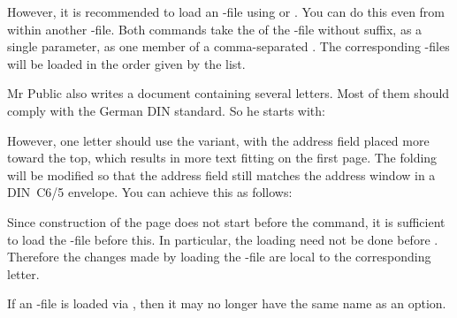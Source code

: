 However, it is recommended to load an -file using
 or
. You can do this
even from within another -file. Both commands take the 
of the -file without suffix,  as a single
parameter,  as one member of a comma-separated
. The corresponding -files will be loaded in
the order given by the list.
\begin{Example}
  Mr Public also writes a document containing several letters. Most of them
  should comply with the German DIN standard. So he starts with:
  However, one letter should use the  variant, with the
  address field placed more toward the top, which results in more text
  fitting on the first page. The folding will be modified so that the
  address field still matches the address window in a DIN~C6/5 envelope.
  You can achieve this as follows:
  Since construction of the page does not start before the
   command, it is sufficient to load the
  -file before this. In particular, the loading need not be done
  before . Therefore the changes made by
  loading the -file are local to the corresponding letter.
\end{Example}

If an -file is loaded via
, then it may no longer have the same name as an option.

